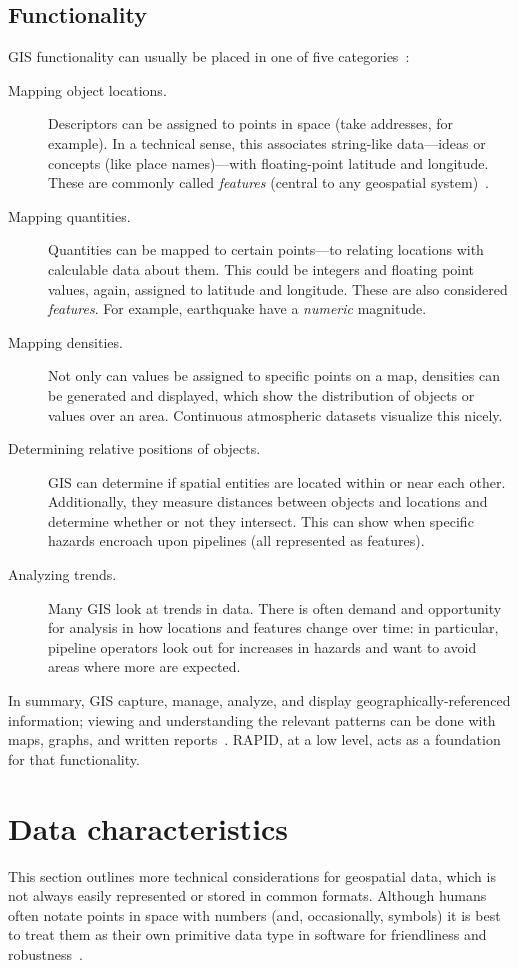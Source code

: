 \subsection{Functionality}
\label{gis_feature}
GIS functionality can usually be placed in one of five categories~\cite{Esriintro}:

\begin{description}
  \item[Mapping object locations.] Descriptors can be assigned to points in space (take addresses, for example). In a technical sense, this associates string-like data---ideas or concepts (like place names)---with floating-point latitude and longitude. These are commonly called \textit{features} (central to any geospatial system)~\cite{Kottman2009}.
  \item[Mapping quantities.] Quantities can be mapped to certain points---to relating locations with calculable data about them. This could be integers and floating point values, again, assigned to latitude and longitude. These are also considered \textit{features}. For example, earthquake have a \textit{numeric} magnitude.
  \item[Mapping densities.] Not only can values be assigned to specific points on a map, densities can be generated and displayed, which show the distribution of objects or values over an area. Continuous atmospheric datasets visualize this nicely.
  \item[Determining relative positions of objects.] GIS can determine if spatial entities are located within or near each other. Additionally, they measure distances between objects and locations and determine whether or not they intersect. This can show when specific hazards encroach upon pipelines (all represented as features).
  \item[Analyzing trends.] Many GIS look at trends in data. There is often demand and opportunity for analysis in how locations and features change over time: in particular, pipeline operators look out for increases in hazards and want to avoid areas where more are expected.
\end{description}

In summary, GIS capture, manage, analyze, and display geographically-referenced information; viewing and understanding the relevant patterns can be done with maps, graphs, and written reports~\cite{Esriintro}. RAPID, at a low level, acts as a foundation for that functionality.

\section{Data characteristics}
This section outlines more technical considerations for geospatial data, which is not always easily represented or stored in common formats. Although humans often notate points in space with numbers (and, occasionally, symbols) it is best to treat them as their own primitive data type in software for friendliness and robustness~\cite{gentle_intro}.

